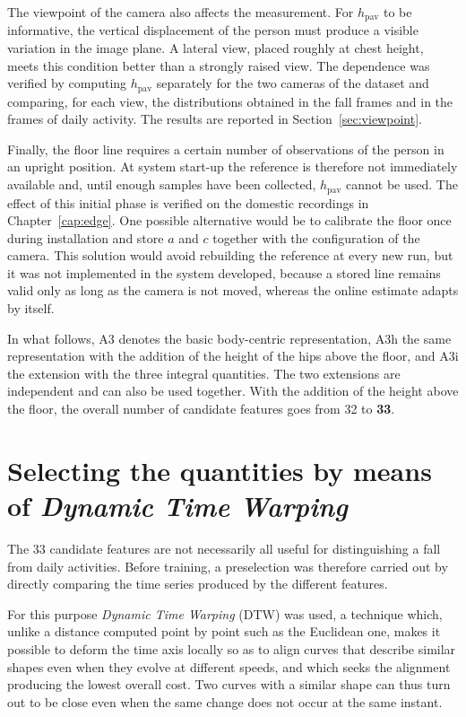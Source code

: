 The viewpoint of the camera also affects the measurement. For \(h_{\text{pav}}\) to be informative, the vertical displacement of the person must produce a visible variation in the image plane. A lateral view, placed roughly at chest height, meets this condition better than a strongly raised view. The dependence was verified by computing \(h_{\text{pav}}\) separately for the two cameras of the dataset and comparing, for each view, the distributions obtained in the fall frames and in the frames of daily activity. The results are reported in Section~\ref{sec:viewpoint}.

Finally, the floor line requires a certain number of observations of the person in an upright position. At system start-up the reference is therefore not immediately available and, until enough samples have been collected, \(h_{\text{pav}}\) cannot be used. The effect of this initial phase is verified on the domestic recordings in Chapter~\ref{cap:edge}.
One possible alternative would be to calibrate the floor once during installation and store \(a\) and \(c\) together with the configuration of the camera. This solution would avoid rebuilding the reference at every new run, but it was not implemented in the system developed, because a stored line remains valid only as long as the camera is not moved, whereas the online estimate adapts by itself.

In what follows, A3 denotes the basic body-centric representation, A3h the same representation with the addition of the height of the hips above the floor, and A3i the extension with the three integral quantities. The two extensions are independent and can also be used together.
With the addition of the height above the floor, the overall number of candidate features goes from 32 to \textbf{33}.

\section{Selecting the quantities by means of \emph{Dynamic Time Warping}}
\label{sec:dtw}

The 33 candidate features are not necessarily all useful for distinguishing a fall from daily activities. Before training, a preselection was therefore carried out by directly comparing the time series produced by the different features.

For this purpose \emph{Dynamic Time Warping} (DTW) was used, a technique which, unlike a distance computed point by point such as the Euclidean one, makes it possible to deform the time axis locally so as to align curves that describe similar shapes even when they evolve at different speeds, and which seeks the alignment producing the lowest overall cost. Two curves with a similar shape can thus turn out to be close even when the same change does not occur at the same instant.

